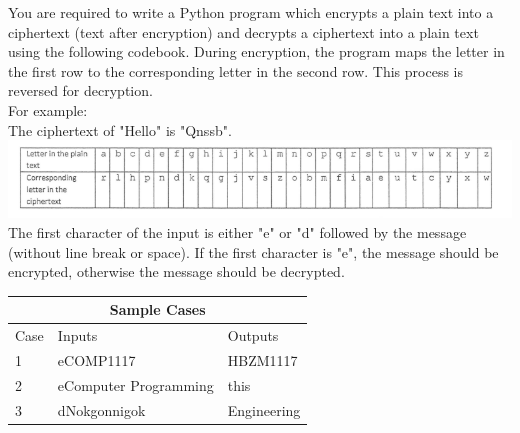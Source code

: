 \documentclass{exam}
\begin{document}
\begin{questions}
    \question[20] You are required to write a Python program which encrypts a plain text into a ciphertext (text after encryption) and decrypts a ciphertext into a plain text using the following codebook. During encryption, the program maps the letter in the first row to the corresponding letter in the second row. This process is reversed for decryption.\\
    For example:\\
    The ciphertext of "Hello" is "Qnssb". \\ 
    \includegraphics[width=15.0cm, scale=1.5]{photo} \\
    The first character of the input is either "e" or "d" followed by the message (without line break or space). If the first character is "e", the message should be encrypted, otherwise the message should be decrypted.
    \begin{center}
    \begin{tabular}{ |p{1cm}||p{11cm}|p{2cm}|  }
    \hline
    \multicolumn{3}{|c|}{Sample Cases} \\
    \hline
    Case& Inputs & Outputs\\
    \hline
    1 & eCOMP1117 & HBZM1117 \\ 
    \hline
    2 & eComputer Programming & this \\ 
    \hline
    3 & dNokgonnigok & Engineering \\
    \hline
    \end{tabular}
    \end{center}

    \end{questions} 
\end{document}
